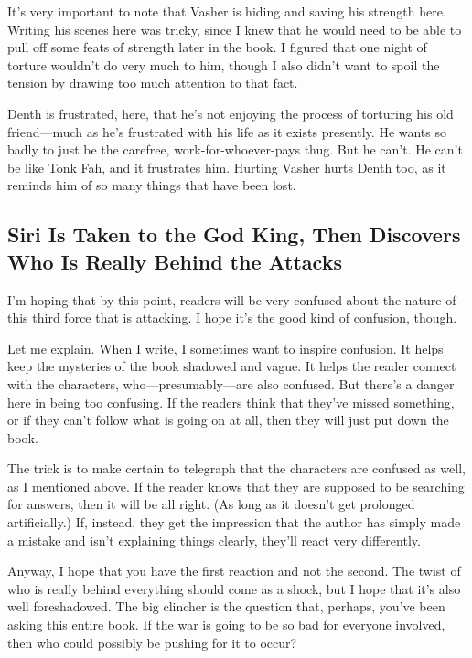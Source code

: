 It’s very important to note that Vasher is hiding and saving his strength here. Writing his scenes here was tricky, since I knew that he would need to be able to pull off some feats of strength later in the book. I figured that one night of torture wouldn’t do very much to him, though I also didn’t want to spoil the tension by drawing too much attention to that fact.

Denth is frustrated, here, that he’s not enjoying the process of torturing his old friend—much as he’s frustrated with his life as it exists presently. He wants so badly to just be the carefree, work-for-whoever-pays thug. But he can’t. He can’t be like Tonk Fah, and it frustrates him. Hurting Vasher hurts Denth too, as it reminds him of so many things that have been lost.

\subsection*{Siri Is Taken to the God King, Then Discovers Who Is Really Behind the Attacks}

I’m hoping that by this point, readers will be very confused about the nature of this third force that is attacking. I hope it’s the good kind of confusion, though.

Let me explain. When I write, I sometimes want to inspire confusion. It helps keep the mysteries of the book shadowed and vague. It helps the reader connect with the characters, who—presumably—are also confused. But there’s a danger here in being too confusing. If the readers think that they’ve missed something, or if they can’t follow what is going on at all, then they will just put down the book.

The trick is to make certain to telegraph that the characters are confused as well, as I mentioned above. If the reader knows that they are supposed to be searching for answers, then it will be all right. (As long as it doesn’t get prolonged artificially.) If, instead, they get the impression that the author has simply made a mistake and isn’t explaining things clearly, they’ll react very differently.

Anyway, I hope that you have the first reaction and not the second. The twist of who is really behind everything should come as a shock, but I hope that it’s also well foreshadowed. The big clincher is the question that, perhaps, you’ve been asking this entire book. If the war is going to be so bad for everyone involved, then who could possibly be pushing for it to occur?

